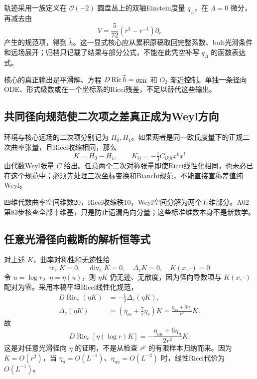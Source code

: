 \documentclass[UTF8,a4paper,11pt,fontset=fandol]{ctexart}
\numberwithin{equation}{section}
\theoremstyle{definition}
\newcommand{\Ric}{\operatorname{Ric}}
\newcommand{\tr}{\operatorname{tr}}
\begin{document}
轨迹采用一族定义在 $\mathcal O(-2)$ 圆盘丛上的双轴Einstein度量 $q_\Lambda$，在 $\Lambda=0$ 微分，再减去由
\[
V=\frac5{72}(r^3-r^{-1})\partial_r
\]
产生的规范项，得到 $\widetilde h$。这一显式核心应从累积原稿取回完整系数、bolt光滑条件和远场展开；归档只记载了结果与部分公式，不能在此凭空补写 $q_\Lambda$ 的函数表达式。

核心的真正输出是平滑解、方程 $D\Ric\widetilde h=g_{\rm EH}$ 和 $O_2$ 渐近控制。单独一条径向ODE、形式级数或在一个坐标系的Ricci残差，不足以替代这些输出。

\subsection{共同径向规范使二次项之差真正成为Weyl方向}
环境与核心远场的二次项分别记为 $H_0,H_1$。如果两者是同一欧氏度量下的正规二次曲率张量，且Ricci收缩相同，那么
\[
K=H_0-H_1,\qquad
K_{ij}=-\tfrac13 C_{ikjl}x^kx^l
\]
由代数Weyl张量 $C$ 给出。任意两个二次对称张量即使Ricci线性化相同，也未必已在这个规范中；必须先处理三次坐标变换和Bianchi规范，不能直接宣称差值纯Weyl。

四维代数曲率空间维数20，Ricci收缩秩10，Weyl空间分解为两个五维部分。A02第83步核查全部十维基，只是防止遗漏角向分量；这些标准维数本身不是新数学。

\subsection{任意光滑径向截断的解析恒等式}
对上述 $K$，曲率对称性和无迹性给
\[
\tr_eK=0,\quad \operatorname{div}_eK=0,\quad
\Delta_eK=0,\quad K(x,\cdot)=0.
\]
令 $u=\log r$，$\eta=\eta(u)$，则 $\eta K$ 仍无迹、无散度，因为径向导数项与 $K(x,\cdot)$ 配对为零。采用本稿平坦Ricci线性化规范，
\begin{align}
D\Ric_e(\eta K)&=-\tfrac12\Delta_e(\eta K),\\
\Delta_e(\eta K)&=\left(\eta_{rr}+\frac7r\eta_r\right)K
=\frac{\eta_{uu}+6\eta_u}{r^2}K.
\end{align}
故
\begin{equation}\label{eq:logidentity}
\boxed{D\Ric_e[\eta(\log r)K]=-
\frac{\eta_{uu}+6\eta_u}{2r^2}K.}
\end{equation}
这是对任意光滑径向 $\eta$ 的证明，不是从检查 $r^p$ 的有限样本归纳而来。因为 $K=O(r^2)$，当 $\eta_u=O(L^{-1})$、$\eta_{uu}=O(L^{-2})$ 时，线性Ricci代价为 $O(L^{-1})$。
\end{document}
